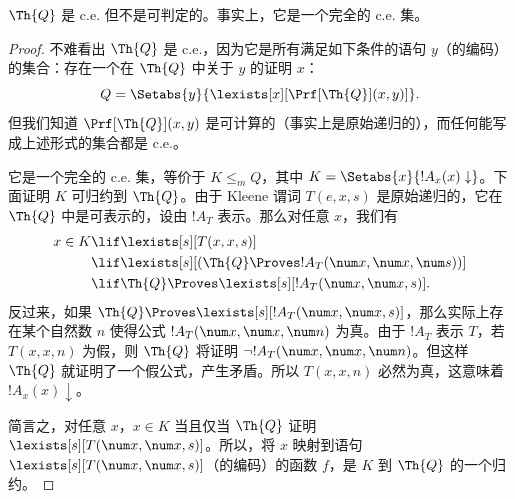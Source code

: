 \documentclass[../../../include/open-logic-section]{subfiles}
\begin{document}



\begin{thm}
$\Th{Q}$ 是 c.e. 但不是可判定的。事实上，它是一个完全的 c.e. 集。
\end{thm}

\begin{proof}
不难看出 $\Th{Q}$ 是 c.e.，因为它是所有满足如下条件的语句 $y$（的编码）的集合：存在一个在 $\Th{Q}$ 中关于 $y$ 的证明 $x$：
\[
Q = \Setabs{y}{\lexists[x][\Prf[\Th{Q}](x,y)]}.
\]
但我们知道 $\Prf[\Th{Q}](x,y)$ 是可计算的（事实上是原始递归的），而任何能写成上述形式的集合都是 c.e.。

它是一个完全的 c.e. 集，等价于 $K \leq_m Q$，其中 $K = \Setabs{x}{!A_x(x) \downarrow}$。下面证明 $K$ 可归约到 $\Th{Q}$。由于 Kleene 谓词 $T(e,x,s)$ 是原始递归的，它在 $\Th{Q}$ 中是可表示的，设由 $!A_T$ 表示。那么对任意 $x$，我们有
\begin{align*}
x \in K & \lif \lexists[s][T(x,x,s)] \\
& \lif \lexists[s][(\Th{Q} \Proves !A_T(\num x,\num x, \num s))]
  \\
& \lif \Th{Q} \Proves \lexists[s][!A_T(\num x, \num x, s)].
\end{align*}
反过来，如果 $\Th{Q} \Proves \lexists[s][!A_T(\num x, \num x, s)]$，那么实际上存在某个自然数 $n$ 使得公式 $!A_T(\num x,
\num x, \num n)$ 为真。由于 $!A_T$ 表示 $T$，若 $T(x,x,n)$ 为假，则 $\Th{Q}$ 将证明 $\lnot !A_T(\num x, \num x, \num n)$。但这样 $\Th{Q}$ 就证明了一个假公式，产生矛盾。所以 $T(x,x,n)$ 必然为真，这意味着 $!A_x(x) \downarrow$。

简言之，对任意 $x$，$x \in K$ 当且仅当 $\Th{Q}$ 证明 $\lexists[s][T(\num x,\num x,s)]$。所以，将 $x$ 映射到语句 $\lexists[s][T(\num x,
  \num x, s)]$（的编码）的函数 $f$，是 $K$ 到 $\Th{Q}$ 的一个归约。
\end{proof}
\end{document}
